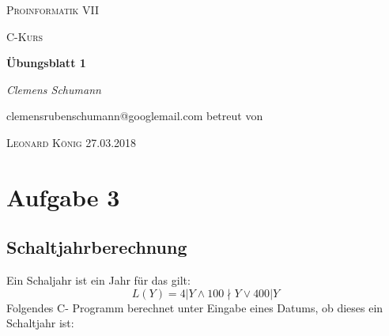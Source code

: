 \documentclass[11pt,a4paper]{article}
\begin{document}
 
 \begin{center}
  {\scshape\LARGE Proinformatik VII \par}
  \vspace{1cm}
  {\scshape\Large C-Kurs \par}
  \vspace{1.5cm}
  {\huge\bfseries \"Ubungsblatt 1 \par}
  \vspace{2cm}
     {\large \itshape{Clemens Schumann}\/ \par}
  \vspace{0.5cm}
  {clemensrubenschumann@googlemail.com}
  \vfill
  betreut von\par
  \textsc{Leonard K\"onig}
  \vfill
  {\Large 27.03.2018}
 
 \end{center}
 
 \thispagestyle{empty}
 
 \newpage
 \setcounter{page}{1}

    \section{Aufgabe 3}
    \subsection{Schaltjahrberechnung}
    Ein Schaljahr ist ein Jahr f\"ur das gilt:
    \begin{equation}
        L(Y) = 4 | Y \wedge 100 \nmid Y \vee 400 | Y
    \end{equation}
    Folgendes C- Programm berechnet unter Eingabe eines Datums, ob dieses ein
    Schaltjahr ist:
    
\end{document}
